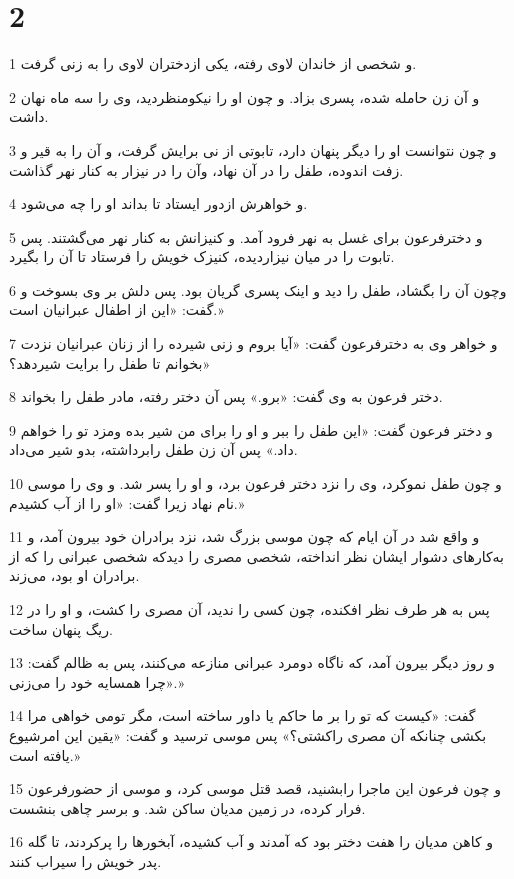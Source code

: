 \chapter{2}

\par 1 و شخصی از خاندان لاوی رفته، یکی ازدختران لاوی را به زنی گرفت.
\par 2 و آن زن حامله شده، پسری بزاد. و چون او را نیکومنظردید، وی را سه ماه نهان داشت.
\par 3 و چون نتوانست او را دیگر پنهان دارد، تابوتی از نی برایش گرفت، و آن را به قیر و زفت اندوده، طفل را در آن نهاد، وآن را در نیزار به کنار نهر گذاشت.
\par 4 و خواهرش ازدور ایستاد تا بداند او را چه می‌شود.
\par 5 و دخترفرعون برای غسل به نهر فرود آمد. و کنیزانش به کنار نهر می‌گشتند. پس تابوت را در میان نیزاردیده، کنیزک خویش را فرستاد تا آن را بگیرد.
\par 6 وچون آن را بگشاد، طفل را دید و اینک پسری گریان بود. پس دلش بر وی بسوخت و گفت: «این از اطفال عبرانیان است.»
\par 7 و خواهر وی به دخترفرعون گفت: «آیا بروم و زنی شیرده را از زنان عبرانیان نزدت بخوانم تا طفل را برایت شیردهد؟»
\par 8 دختر فرعون به وی گفت: «برو.» پس آن دختر رفته، مادر طفل را بخواند.
\par 9 و دختر فرعون گفت: «این طفل را ببر و او را برای من شیر بده ومزد تو را خواهم داد.» پس آن زن طفل رابرداشته، بدو شیر می‌داد.
\par 10 و چون طفل نموکرد، وی را نزد دختر فرعون برد، و او را پسر شد. و وی را موسی نام نهاد زیرا گفت: «او را از آب کشیدم.»
\par 11 و واقع شد در آن ایام که چون موسی بزرگ شد، نزد برادران خود بیرون آمد، و به‌کارهای دشوار ایشان نظر انداخته، شخصی مصری را دیدکه شخصی عبرانی را که از برادران او بود، می‌زند.
\par 12 پس به هر طرف نظر افکنده، چون کسی را ندید، آن مصری را کشت، و او را در ریگ پنهان ساخت.
\par 13 و روز دیگر بیرون آمد، که ناگاه دومرد عبرانی منازعه می‌کنند، پس به ظالم گفت: «چرا همسایه خود را می‌زنی.»
\par 14 گفت: «کیست که تو را بر ما حاکم یا داور ساخته است، مگر تومی خواهی مرا بکشی چنانکه آن مصری راکشتی؟» پس موسی ترسید و گفت: «یقین این امرشیوع یافته است.»
\par 15 و چون فرعون این ماجرا رابشنید، قصد قتل موسی کرد، و موسی از حضورفرعون فرار کرده، در زمین مدیان ساکن شد. و برسر چاهی بنشست.
\par 16 و کاهن مدیان را هفت دختر بود که آمدند و آب کشیده، آبخورها را پرکردند، تا گله پدر خویش را سیراب کنند.

